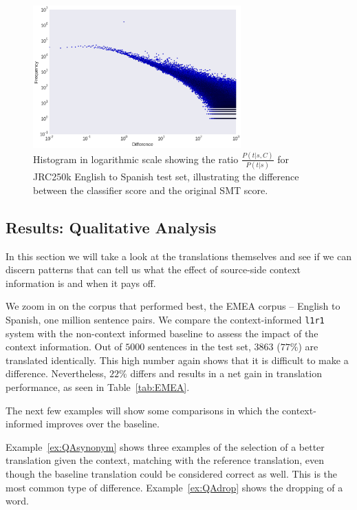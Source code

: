 \documentclass[smallextended]{svjour3}       %
\theoremstyle{break}
\begin{document}
\begin{figure}
\includegraphics[width=80.00mm]{scoredifference.png}
\caption{Histogram in logarithmic scale showing the ratio $\frac{P(t|s,C)}{P(t|s)}$ for JRC250k English to Spanish test set, illustrating the difference between the classifier score and the original SMT score.}
\label{fig:scoredifference}
\end{figure}



\subsection{Results: Qualitative Analysis}

In this section we will take a look at the translations themselves and see if
we can discern patterns that can tell us what the effect of source-side context
information is and when it pays off.

We zoom in on the corpus that performed best, the EMEA corpus -- English to
Spanish, one million sentence pairs. We compare the context-informed
\texttt{l1r1} system with the non-context informed baseline to assess the
impact of the context information. Out of $5000$ sentences in the test set,
$3863$ ($77\%$) are translated identically. This high number again shows that
it is difficult to make a difference. Nevertheless, $22\%$ differs and results
in a net gain in translation performance, as seen in Table~\ref{tab:EMEA}.

The next few examples will show some comparisons in which the context-informed
improves over the baseline. 

Example~\ref{ex:QAsynonym} shows three examples of the selection of a better
translation given the context, matching with the reference translation, even
though the baseline translation could be considered correct as well. This is
the most common type of difference. Example~\ref{ex:QAdrop} shows the dropping
of a word.
\end{document}
